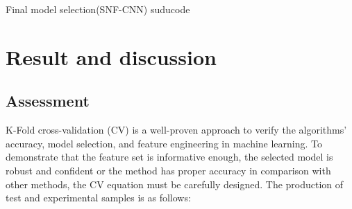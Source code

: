 \documentclass{bmcart}
\begin{document}
\renewcommand{\algorithmicrequire}{\textbf{Input:}}
\renewcommand{\algorithmicensure}{\textbf{Output:}}
\begin{algorithm}[!h]
\caption{Final model selection(SNF-CNN) suducode}
\label{SNFCNNSuducode}
\end{algorithm}


\section*{Result and discussion}
\subsection*{Assessment}
K-Fold cross-validation (CV) is a well-proven approach to verify the algorithms' accuracy, model selection, and feature engineering in machine learning. To demonstrate that the feature set is informative enough, the selected model is robust and confident or the method has proper accuracy in comparison with other methods, the CV equation must be carefully designed. The production of test and experimental samples is as follows:
\end{document}
